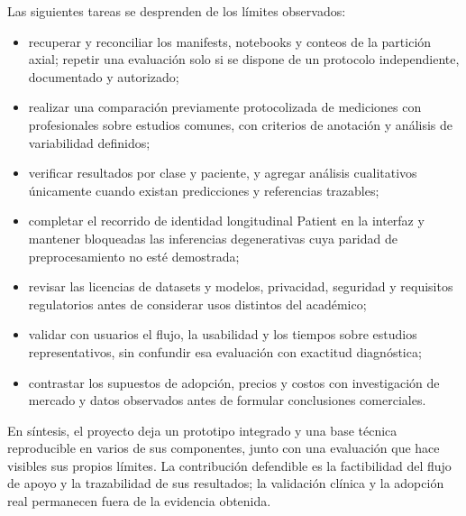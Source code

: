 Las siguientes tareas se desprenden de los límites observados:
\begin{itemize}
  \item recuperar y reconciliar los manifests, notebooks y conteos de la partición axial; repetir una evaluación solo si se dispone de un protocolo independiente, documentado y autorizado;
  \item realizar una comparación previamente protocolizada de mediciones con profesionales sobre estudios comunes, con criterios de anotación y análisis de variabilidad definidos;
  \item verificar resultados por clase y paciente, y agregar análisis cualitativos únicamente cuando existan predicciones y referencias trazables;
  \item completar el recorrido de identidad longitudinal Patient en la interfaz y mantener bloqueadas las inferencias degenerativas cuya paridad de preprocesamiento no esté demostrada;
  \item revisar las licencias de datasets y modelos, privacidad, seguridad y requisitos regulatorios antes de considerar usos distintos del académico;
  \item validar con usuarios el flujo, la usabilidad y los tiempos sobre estudios representativos, sin confundir esa evaluación con exactitud diagnóstica;
  \item contrastar los supuestos de adopción, precios y costos con investigación de mercado y datos observados antes de formular conclusiones comerciales.
\end{itemize}

En síntesis, el proyecto deja un prototipo integrado y una base técnica reproducible en varios de sus componentes, junto con una evaluación que hace visibles sus propios límites. La contribución defendible es la factibilidad del flujo de apoyo y la trazabilidad de sus resultados; la validación clínica y la adopción real permanecen fuera de la evidencia obtenida.
